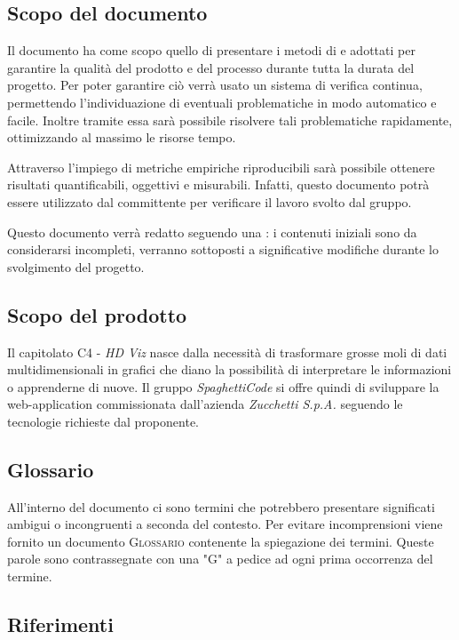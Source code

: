 \documentclass[../piano_di_qualifica.tex]{subfiles}
\begin{document}
\subsection{Scopo del documento}
Il documento ha come scopo quello di presentare i metodi di  e  adottati per garantire la qualità del prodotto e del processo durante tutta la durata del progetto. 
Per poter garantire ciò verrà usato un sistema di verifica continua, permettendo l'individuazione di eventuali problematiche in modo automatico e facile. Inoltre tramite essa sarà possibile risolvere tali problematiche rapidamente, ottimizzando al massimo le risorse tempo.

Attraverso l’impiego di metriche empiriche riproducibili sarà possibile ottenere risultati quantificabili, oggettivi e misurabili. Infatti, questo documento potrà essere utilizzato dal committente per verificare il lavoro svolto dal gruppo.

Questo documento verrà redatto seguendo una : i contenuti iniziali sono da considerarsi incompleti, verranno sottoposti a significative modifiche  durante lo svolgimento del progetto.

\subsection{Scopo del prodotto}
Il capitolato C4 - \emph{HD Viz} nasce dalla necessità di trasformare grosse moli di dati multidimensionali in grafici che diano la possibilità di interpretare le informazioni o apprenderne di nuove. Il gruppo \emph{SpaghettiCode} si offre quindi di sviluppare la web-application commissionata dall’azienda \emph{Zucchetti S.p.A.} seguendo le tecnologie richieste dal proponente.

\subsection{Glossario}
All'interno del documento ci sono termini che potrebbero presentare significati ambigui o incongruenti a seconda del contesto. Per evitare incomprensioni viene fornito un documento \textsc{Glossario} contenente la spiegazione dei termini. Queste parole sono contrassegnate con una "G" a pedice ad ogni prima occorrenza del termine.

\subsection{Riferimenti}
\label{sub:riferimenti}
\end{document}
